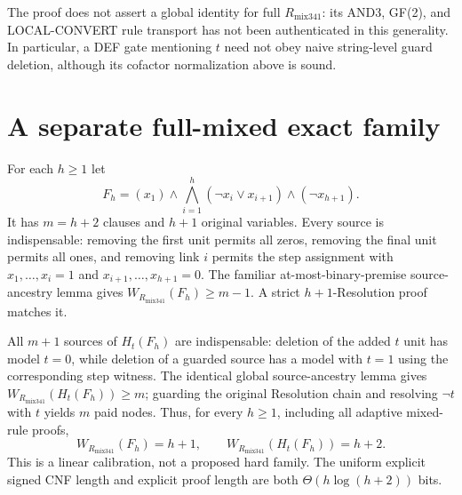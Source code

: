\documentclass[11pt]{article}
\begin{document}
\noindent The proof does not assert a global identity for full \(R_{\mathrm{mix341}}\): its AND3, GF(2), and LOCAL-CONVERT rule transport has not been authenticated in this generality. In particular, a DEF gate mentioning \(t\) need not obey naive string-level guard deletion, although its cofactor normalization above is sound.

\section*{A separate full-mixed exact family}
For each \(h\ge1\) let
\[
F_h=(x_1)\wedge\bigwedge_{i=1}^{h}(\neg x_i\vee x_{i+1})\wedge(\neg x_{h+1}).
\]
It has \(m=h+2\) clauses and \(h+1\) original variables. Every source is indispensable: removing the first unit permits all zeros, removing the final unit permits all ones, and removing link \(i\) permits the step assignment with \(x_1,\ldots,x_i=1\) and \(x_{i+1},\ldots,x_{h+1}=0\). The familiar at-most-binary-premise source-ancestry lemma gives \(W_{R_{\mathrm{mix341}}}(F_h)\ge m-1\). A strict \(h+1\)-Resolution proof matches it.

All \(m+1\) sources of \(H_t(F_h)\) are indispensable: deletion of the added \(t\) unit has model \(t=0\), while deletion of a guarded source has a model with \(t=1\) using the corresponding step witness. The identical global source-ancestry lemma gives \(W_{R_{\mathrm{mix341}}}(H_t(F_h))\ge m\); guarding the original Resolution chain and resolving \(\neg t\) with \(t\) yields \(m\) paid nodes. Thus, for every \(h\ge1\), including all adaptive mixed-rule proofs,
\[
\boxed{W_{R_{\mathrm{mix341}}}(F_h)=h+1,\qquad
W_{R_{\mathrm{mix341}}}(H_t(F_h))=h+2.}
\]
This is a linear calibration, not a proposed hard family. The uniform explicit signed CNF length and explicit proof length are both \(\Theta(h\log(h+2))\) bits.
\end{document}

